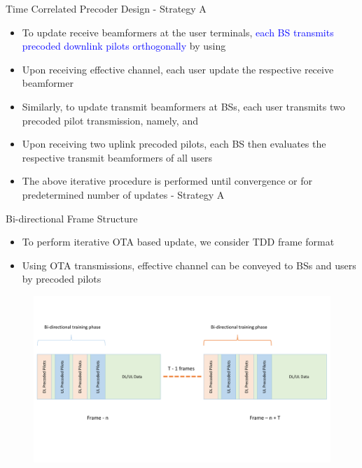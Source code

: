 \documentclass[9pt]{beamer}
\begin{document}
\begin{frame}{Time Correlated Precoder Design - Strategy A}
	\begin{itemize}
		\item To update receive beamformers at the user terminals, \textcolor{blue}{each \ac{BS} transmits precoded downlink pilots orthogonally} by using 
		\item Upon receiving effective channel, each user update the respective receive beamformer
		\item Similarly, to update transmit beamformers at \acp{BS}, \textcolor[rgb]{0,0.6,0}{each user transmits two precoded pilot transmission}, namely,  and 
		\item Upon receiving two uplink precoded pilots, each \ac{BS} then evaluates the respective transmit beamformers of all users
		\item The above iterative procedure is performed until convergence or for predetermined number of updates - \alert{Strategy A}
	\end{itemize}	
\end{frame}

\begin{frame}{Bi-directional Frame Structure}
	\begin{itemize}
		\item To perform iterative \ac{OTA} based update, we \textcolor[rgb]{0.7,0,0}{consider \ac{TDD} frame format}
		\item Using \ac{OTA} transmissions, \textcolor[rgb]{0,0.6,0}{effective channel can be conveyed to \acp{BS} and users by precoded pilots}
	\end{itemize}
	\begin{figure}
		\centering
		\includegraphics[trim=4mm 40mm 10mm 10mm,clip, width=\columnwidth ]{bit_model.pdf}
		\label{fig-a}
	\end{figure}
\end{frame}
\end{document}
